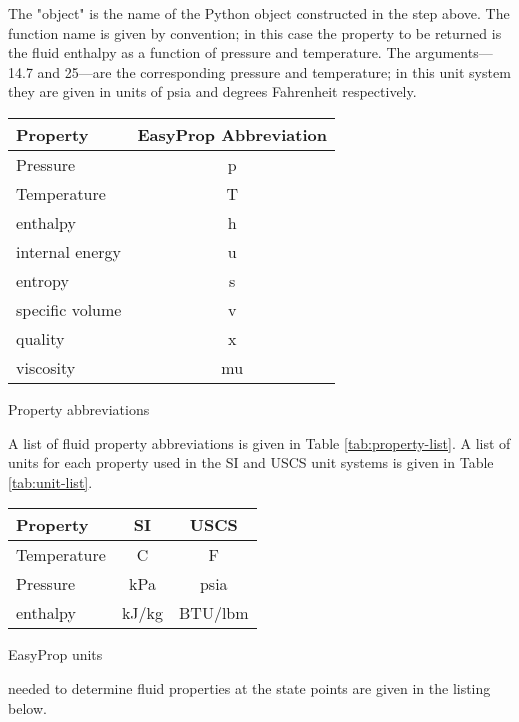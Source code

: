 The "object" is the name of the Python object constructed in the step above.  The function name is given by convention; in this case the property to be returned is the fluid enthalpy as a function of pressure and temperature.  The arguments---14.7 and 25---are the corresponding pressure and temperature; in this unit system they are given in units of psia and degrees Fahrenheit respectively.
\begin{margintable}
\begin{tabular}{lc}
\toprule
Property & EasyProp Abbreviation \\
\midrule
Pressure & p \\
Temperature & T \\
enthalpy & h \\
internal energy  & u \\
entropy & s \\
specific volume  & v \\
quality & x \\
viscosity & mu \\
\bottomrule
\end{tabular}
\caption{Property abbreviations}
\label{tab:property-list}
\vspace{0.5cm}
\end{margintable}

A list of fluid property abbreviations is given in Table \ref{tab:property-list}.  A list of units for each property used in the SI and USCS unit systems is given in Table \ref{tab:unit-list}.


\begin{margintable}
\begin{tabular}{lcc}
\toprule
Property & SI & USCS \\
\midrule
Temperature & C & F \\
Pressure & kPa & psia \\
enthalpy & kJ/kg & BTU/lbm \\
\bottomrule
\end{tabular}
\caption{EasyProp units}
\label{tab:unit-list}
\end{margintable}

 needed to determine fluid properties at the state points are given in the listing below.

